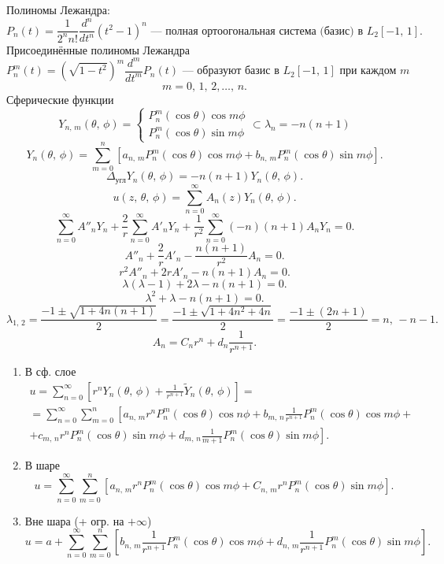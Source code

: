 \documentclass[a4paper]{article}
\begin{document}
Полиномы Лежандра:
\[
	P_{n}(t) = \frac{1}{2^n n!} \frac{d^n}{dt^n} (t^2 -1)^n \text{ --- полная ортоогональная система (базис) в } L_2[-1,\,1]
.\] 
Присоединённые полиномы Лежандра
\[
	P^m_n (t)= \left( \sqrt{1-t^2}  \right) ^m \frac{d^m}{dt^m}
	P_n(t)
\text{ --- образуют базис в } L_2[-1,\,1] \text{ при каждом }m\] 
\[
m=0,\,1,\,2,\ldots,\,n
.\] 
Сферические функции
\[
	Y_{n,\,m}(\theta,\,\phi)=
	\begin{cases}
		P^m_n (\cos \theta) \cos m\phi\\
		P_n^m(\cos\theta)\sin m \phi
	\end{cases} \subset 
\lambda_n =-n (n+1)\] 
\[
	Y_{n}(\theta,\,\phi)= \sum_{m=0}^{n} \left[ 
	a_{n,\,m}P^{m}_n(\cos \theta) \cos m \phi+
b_{n,\,m}P^m_n(\cos \theta) \sin m \phi\right] 
.\] 
\[
	\Delta_\text{угл} Y_n(\theta,\,\phi)=- n(n+1) Y_n(\theta,\,\phi)
.\] 
\[
	u(z,\,\theta,\,\phi)= \sum_{n=0}^{\infty} A_n (z) Y_n(\theta,\,\phi)
.\] 
\[
\sum_{n=0}^{\infty} A''_n Y_n+ \frac{2}{r} \sum_{n=0}^{\infty} A'_n
Y_n + \frac{1}{r^2}\sum_{n=0}^{\infty} (-n)(n+1)  A_n Y_n=0
.\] 
\[
	A''_n+\frac{2}{r} A'_n - \frac{n(n+1)}{r^2}A_n=0
.\] 
\[
	r^2 A''_n +2 r A'_n - n(n+1)A_n=0
.\] 
\[
	\lambda (\lambda-1) +2 \lambda -n(n+1)=0
.\] 
\[
	\lambda^2 +\lambda -n(n+1)=0
.\]
\[
	\lambda_{1,\,2}= \frac{-1\pm\sqrt{1+4n(n+1)} }{2}=
	\frac{-1\pm \sqrt{1+4 n^2+4n} }{2}=\frac{-1 \pm(2n+1)}{2}=
	n,\, -n-1
.\] 
\[
A_n=C_n r^n +d_n \frac{1}{r^{n+1}}
.\] 
\begin{enumerate}
	\item В сф. слое
		\begin{multline*}
		u= \sum_{n=0}^{\infty} \left[ 
		r^n Y_n (\theta,\,\phi)+\frac{1}{r^{n+1}}\tilde{Y}_n
	(\theta,\,\phi)\right] =\\=
	\sum_{n=0}^{\infty} \sum_{m=0}^{n} \left[ 
	a_{n,\,m}r^n P^m_n (\cos \theta)\cos n \phi+b_{m,\,n}
\frac{1}{r^{n+1}}P_n^m (\cos\theta) \cos m \phi 
\right.+\\+ \left.c_{m,\,n}r^n P^m_n (\cos\theta) \sin m\phi +
d_{m,\,n} \frac{1}{m+1} P^m_n (\cos \theta) \sin m \phi\right] 
		.\end{multline*} 
		\item  В шаре
\[
	u = \sum_{n=0}^{\infty} \sum_{m=0}^{n} \left[a_{n,\,m} r^n P^m_n
	(\cos\theta) \cos m \phi + C_{n,\,m}r^n P^m_n (\cos\theta)
\sin m \phi\right]
.\] 
\item Вне шара (+ огр. на $+\infty$)
 \[
u= a + \sum_{n=0}^{\infty} \sum_{m=0}^{n} \left[ b_{n,\,m}
\frac{1}{r^{n+1}}P^m_n (\cos\theta)\cos m \phi + d_{n,\,m}
\frac{1}{r^{n+1}}P^m_n (\cos \theta) \sin m \phi\right] 
.\] 
\end{enumerate}
\end{document}
